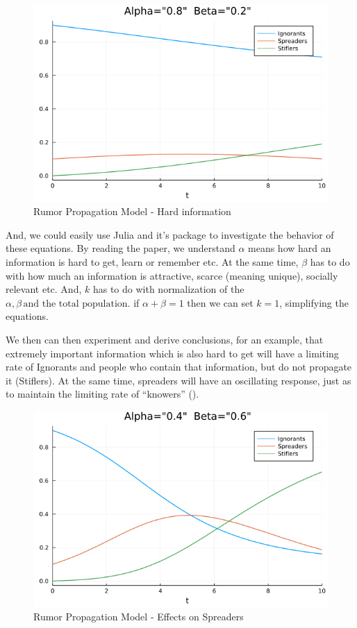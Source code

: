 \documentclass[
12pt,				%
openright,			%
oneside,			%
a4paper,			%
brazil,				%
english,			%
]{abntex2}
\begin{document}
\begin{figure}[ht]
  \centering
    \caption{\label{fig:diffeq-case1} Rumor Propagation Model - Hard information}
    \includegraphics[width=0.5\linewidth]{Imagens/fig09.png}
\end{figure}

And, we could easily use Julia and it's package to investigate the behavior of these equations. By reading the paper, we understand $\alpha$ means how hard an information is hard to get, learn or remember etc. At the same time, $\beta$ has to do with how much an information is attractive, scarce (meaning unique), socially relevant etc. And, $k$ has to do with normalization of the $\alpha, \beta{} \, \textrm{and the total population}$. if $\alpha + \beta = 1$ then we can set $k=1$, simplifying the equations.%


We then can then experiment and derive conclusions, for an example, that extremely important information which is also hard to get will have a limiting rate of Ignorants and people who contain that information, but do not propagate it (Stiflers). At the same time, spreaders will have an oscillating response, just as to maintain the limiting rate of ``knowers'' ().

\begin{figure}[!htb]
  \centering
    \caption{\label{fig:diffeq-case2} Rumor Propagation Model - Effects on Spreaders}
    \includegraphics[width=0.5\linewidth]{Imagens/fig95.png}
\end{figure}
\end{document}
